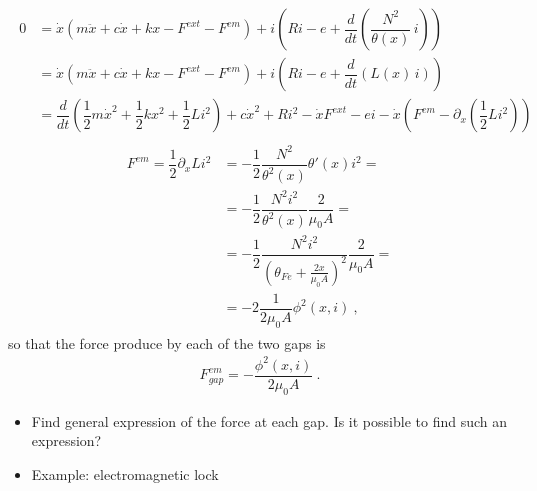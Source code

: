 \documentclass[letterpaper,10pt,english]{jupyterBook}
\begin{document}
\begin{equation*}
\begin{split}\begin{aligned}
  0 
  & = \dot{x} \left( m \ddot{x} + c \dot{x} + k x - F^{ext} - F^{em} \right) + i \left( R i - e + \dfrac{d}{dt} \left( \dfrac{N^2}{\theta(x)} \, i \right) \right) \\
  & = \dot{x} \left( m \ddot{x} + c \dot{x} + k x - F^{ext} - F^{em} \right) + i \left( R i - e + \dfrac{d}{dt} \left( L(x) \, i \right) \right) \\
  & = \dfrac{d}{dt} \left( \dfrac{1}{2} m \dot{x}^2 + \dfrac{1}{2} k x^2 + \dfrac{1}{2} L i^2 \right) + c \dot{x}^2 + R i^2 - \dot{x} F^{ext} - e i - \dot{x} \left( F^{em} - \partial_x \left( \dfrac{1}{2} L i^2 \right) \right)
\end{aligned}\end{split}
\end{equation*}\begin{equation*}
\begin{split}\begin{aligned}
  F^{em} = \dfrac{1}{2} \partial_x L i^2
  & = - \dfrac{1}{2} \dfrac{N^2}{\theta^2(x)} \theta'(x) i^2 = \\
  & = - \dfrac{1}{2} \dfrac{N^2 i^2}{\theta^2(x)} \dfrac{2}{\mu_0 A} = \\
  & = - \dfrac{1}{2} \dfrac{N^2 i^2}{\left( \theta_{Fe} + \frac{2 x}{\mu_0 A} \right)^2} \dfrac{2}{\mu_0 A} = \\
  & = - 2 \dfrac{1}{2 \mu_0 A} \phi^2(x,i) \ ,
\end{aligned}\end{split}
\end{equation*}
\sphinxAtStartPar
so that the force produce by each of the two gaps is
\begin{equation*}
\begin{split}F^{em}_{gap} = -\dfrac{\phi^2(x,i)}{2 \mu_0 A} \ .\end{split}
\end{equation*}
\sphinxAtStartPar
{}
\begin{itemize}
\item {} 
\sphinxAtStartPar
Find general expression of the force at each gap. Is it possible to find such an expression?

\item {} 
\sphinxAtStartPar
Example: electromagnetic lock

\end{itemize}
\end{document}
